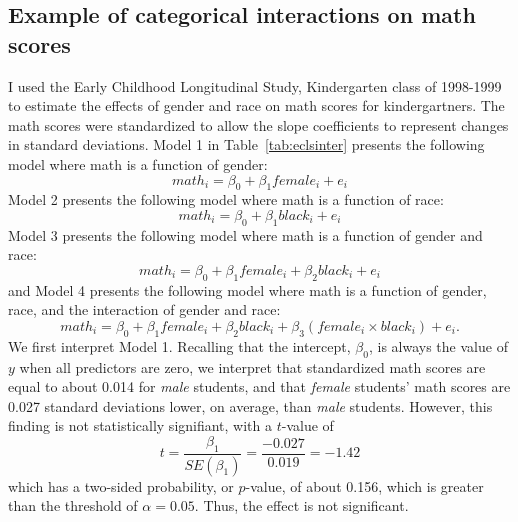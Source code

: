 \subsection{Example of categorical interactions on math scores}
  I used the Early Childhood Longitudinal Study, Kindergarten class of 1998-1999 to estimate the effects of gender and race on math scores for kindergartners. The math scores were standardized to allow the slope coefficients to represent changes in standard deviations. Model 1 in Table~\ref{tab:eclsinter} presents the following model where math is a function of gender:
\[
math_i=\beta_0+\beta_1female_i+e_i
\]
Model 2 presents the following model where math is a function of race:
\[
math_i=\beta_0+\beta_1black_i+e_i
\]
Model 3 presents the following model where math is a function of gender and race:
\[
math_i=\beta_0+\beta_1female_i+\beta_2black_i+e_i
\]
and Model 4 presents the following model where math is a function of gender, race, and the interaction of gender and race:
\[
math_i=\beta_0+\beta_1female_i+\beta_2black_i+\beta_3\left(female_i\times black_i\right)+e_i.
\]
We first interpret Model 1. Recalling that the intercept, $\beta_0$, is always the value of $y$ when all predictors are zero, we interpret that standardized math scores are equal to about 0.014 for {\it male} students, and that {\it female} students' math scores are 0.027 standard deviations lower, on average, than {\it male} students. However, this finding is not statistically signifiant, with a $t$-value of
\[
t=\frac{\beta_1}{SE\left(\beta_1\right)}=\frac{-0.027}{0.019}=-1.42
\]
which has a two-sided probability, or $p$-value, of about 0.156, which is greater than the threshold of $\alpha = 0.05$. Thus, the effect is not significant.
